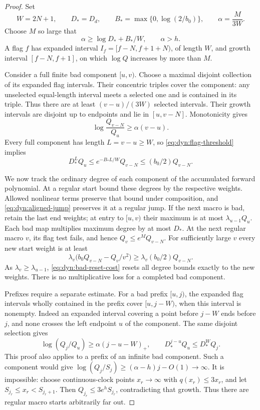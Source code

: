 \begin{proof}
Set
\[
 W=2N+1,\qquad D_*=D_d,\qquad
 B_* =\max\{0,\log(2/b_0)\},\qquad \alpha=\frac{M}{3W}.
\]
Choose $M$ so large that
\begin{equation}
 \alpha\ge\log D_*+B_*/W,\qquad \alpha>h.
 \label{eq:dyn:flag-threshold}
\end{equation}
A flag $f$ has expanded interval $I_f=[f-N,f+1+N)$, of length $W$,
and growth interval $[f-N,f+1]$, on which $\log Q$ increases by more
than $M$.

Consider a full finite bad component $[u,v)$.  Choose a maximal
disjoint collection of its expanded flag intervals.  Their concentric
triples cover the component: any unselected equal-length interval
meets a selected one and is contained in its triple.  Thus there are
at least $(v-u)/(3W)$ selected intervals.  Their growth intervals are
disjoint up to endpoints and lie in $[u,v-N]$.  Monotonicity gives
\begin{equation}
 \log\frac{Q_{v-N}}{Q_u}\ge\alpha(v-u).
 \label{eq:dyn:full-bad-growth}
\end{equation}
Every full component has length $L=v-u\ge W$, so
\eqref{eq:dyn:flag-threshold} implies
\begin{equation}
 D_*^L Q_u\le e^{-B_*L/W}Q_{v-N}
             \le(b_0/2)Q_{v-N}.
 \label{eq:dyn:bad-reset-cost}
\end{equation}

We now track the ordinary degree of each component of the accumulated
forward polynomial.  At a regular start bound these degrees by the
respective weights.  Allowed nonlinear terms preserve that bound
under composition, and \eqref{eq:dyn:aligned-jump} preserves it at a
regular jump.  If the next macro is bad, retain the last end weights;
at entry to $[u,v)$ their maximum is at most
$\lambda_{u-1}Q_u$.  Each bad map multiplies maximum degree by at most
$D_*$.  At the next regular macro $v$, its flag test fails, and hence
$Q_v\le e^M Q_{v-N}$.  For sufficiently large $v$ every new start
weight is at least
\[
 \lambda_v\bigl(b_0Q_{v-N}-Q_v/v^2\bigr)
 \ge\lambda_v(b_0/2)Q_{v-N}.
\]
As $\lambda_v\ge\lambda_{u-1}$,
\eqref{eq:dyn:bad-reset-cost} resets all degree bounds exactly to the
new weights.  There is no multiplicative loss for a completed bad
component.

Prefixes require a separate estimate.  For a bad prefix $[u,j)$,
the expanded flag intervals wholly contained in the prefix cover
$[u,j-W)$, when this interval is nonempty.  Indeed an expanded interval
covering a point before $j-W$ ends before $j$, and none crosses the
left endpoint $u$ of the component.  The same disjoint selection gives
\begin{equation}
 \log(Q_j/Q_u)\ge\alpha(j-u-W)_+,
 \qquad D_*^{j-u}Q_u\le D_*^W Q_j.
 \label{eq:dyn:bad-prefix-growth}
\end{equation}
This proof also applies to a prefix of an infinite bad component.
Such a component would give
$\log(Q_j/S_j)\ge(\alpha-h)j-O(1)\to\infty$.
It is impossible: choose continuous-clock points $x_r\to\infty$ with
$q(x_r)\le3x_r$, and let $S_{j_r}\le x_r<S_{j_r+1}$.
Then $Q_{j_r}\le3e^h S_{j_r}$, contradicting that growth.
Thus there are regular macro starts arbitrarily far out.


\end{proof}
